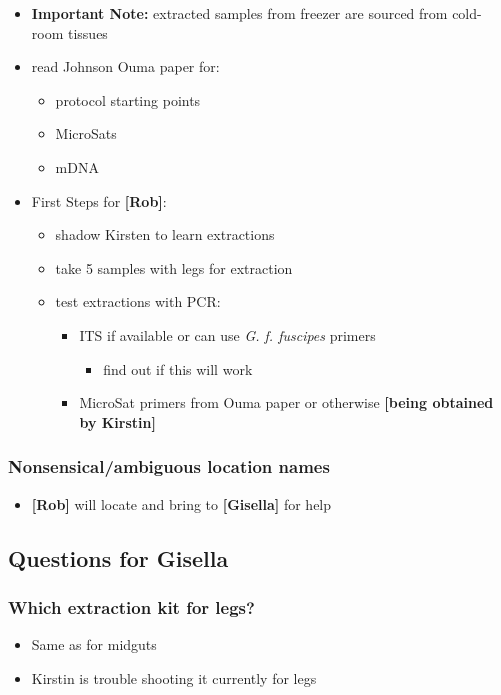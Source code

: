 \documentclass[letterpaper]{scrartcl}
\begin{document}
\begin{itemize}
\itemsep1pt\parskip0pt
\item
  \textbf{Important Note:} extracted samples from freezer are sourced
  from cold-room tissues
\item
  read Johnson Ouma paper for:

  \begin{itemize}
  \itemsep1pt\parskip0pt
  \item
    protocol starting points
  \item
    MicroSats
  \item
    mDNA
  \end{itemize}
\item
  First Steps for \textbf{{[}Rob{]}}:

  \begin{itemize}
  \itemsep1pt\parskip0pt
  \item
    shadow Kirsten to learn extractions
  \item
    take 5 samples with legs for extraction
  \item
    test extractions with PCR:

    \begin{itemize}
    \itemsep1pt\parskip0pt
    \item
      ITS if available or can use \emph{G. f. fuscipes} primers

      \begin{itemize}
      \itemsep1pt\parskip0pt
      \item
        find out if this will work
      \end{itemize}
    \item
      MicroSat primers from Ouma paper or otherwise \textbf{{[}being
      obtained by Kirstin{]}}
    \end{itemize}
  \end{itemize}
\end{itemize}

\subsubsection{Nonsensical/ambiguous location
names}\label{nonsensicalambiguous-location-names}

\begin{itemize}
\itemsep1pt\parskip0pt
\item
  \textbf{{[}Rob{]}} will locate and bring to \textbf{{[}Gisella{]}} for
  help
\end{itemize}

\subsection{Questions for Gisella}\label{questions-for-gisella}

\subsubsection{Which extraction kit for
legs?}\label{which-extraction-kit-for-legs}

\begin{itemize}
\itemsep1pt\parskip0pt
\item
  Same as for midguts
\item
  Kirstin is trouble shooting it currently for legs
\end{itemize}
\end{document}
